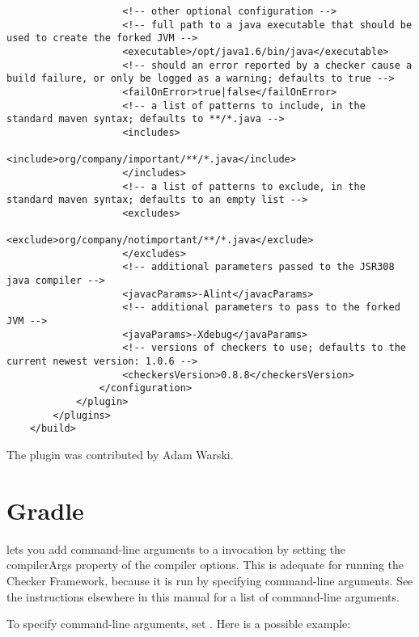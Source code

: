 \begin{enumerate}
\begin{Verbatim}
                    <!-- other optional configuration -->
                    <!-- full path to a java executable that should be used to create the forked JVM -->
                    <executable>/opt/java1.6/bin/java</executable>
                    <!-- should an error reported by a checker cause a build failure, or only be logged as a warning; defaults to true -->
                    <failOnError>true|false</failOnError>
                    <!-- a list of patterns to include, in the standard maven syntax; defaults to **/*.java -->
                    <includes>
                        <include>org/company/important/**/*.java</include>
                    </includes>
                    <!-- a list of patterns to exclude, in the standard maven syntax; defaults to an empty list -->
                    <excludes>
                        <exclude>org/company/notimportant/**/*.java</exclude>
                    </excludes>
                    <!-- additional parameters passed to the JSR308 java compiler -->
                    <javacParams>-Alint</javacParams>
                    <!-- additional parameters to pass to the forked JVM -->
                    <javaParams>-Xdebug</javaParams>
                    <!-- versions of checkers to use; defaults to the current newest version: 1.0.6 -->
                    <checkersVersion>0.8.8</checkersVersion>
                </configuration>
            </plugin>
        </plugins>
    </build>
\end{Verbatim}

\end{enumerate}

The plugin was contributed by Adam Warski.


\section{Gradle\label{gradle}}


 lets you add command-line arguments to a
 invocation by setting the compilerArgs property of the
compiler options.  This is adequate for running the Checker Framework,
because it is run by specifying command-line arguments.  See the
instructions elsewhere in this manual for a list of command-line arguments.

To specify command-line arguments, set
.  Here is a possible example:

